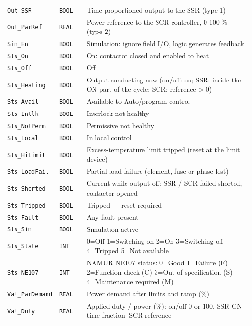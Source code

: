 \begin{small}
\begin{longtable}{@{}P{3.70cm}P{2.20cm}P{1.70cm}P{8.91cm}@{}}
\texttt{Out\_SSR} & \texttt{BOOL} &  & Time-proportioned output to the SSR (type 1) \\
\texttt{Out\_PwrRef} & \texttt{REAL} &  & Power reference to the SCR controller, 0-100 \% (type 2) \\
\texttt{Sim\_En} & \texttt{BOOL} &  & Simulation: ignore field I/\allowbreak{}O, logic generates feedback \\
\texttt{Sts\_On} & \texttt{BOOL} &  & On: contactor closed and enabled to heat \\
\texttt{Sts\_Off} & \texttt{BOOL} &  & Off \\
\texttt{Sts\_Heating} & \texttt{BOOL} &  & Output conducting now (on/\allowbreak{}off: on; SSR: inside the ON part of the cycle; SCR: reference \textgreater{} 0) \\
\texttt{Sts\_Avail} & \texttt{BOOL} &  & Available to Auto/\allowbreak{}program control \\
\texttt{Sts\_Intlk} & \texttt{BOOL} &  & Interlock not healthy \\
\texttt{Sts\_NotPerm} & \texttt{BOOL} &  & Permissive not healthy \\
\texttt{Sts\_Local} & \texttt{BOOL} &  & In local control \\
\texttt{Sts\_HiLimit} & \texttt{BOOL} &  & Excess-temperature limit tripped (reset at the limit device) \\
\texttt{Sts\_LoadFail} & \texttt{BOOL} &  & Partial load failure (element, fuse or phase lost) \\
\texttt{Sts\_Shorted} & \texttt{BOOL} &  & Current while output off: SSR /\allowbreak{} SCR failed shorted, contactor opened \\
\texttt{Sts\_Tripped} & \texttt{BOOL} &  & Tripped --- reset required \\
\texttt{Sts\_Fault} & \texttt{BOOL} &  & Any fault present \\
\texttt{Sts\_Sim} & \texttt{BOOL} &  & Simulation active \\
\texttt{Sts\_State} & \texttt{INT} &  & 0=Off 1=Switching on 2=On 3=Switching off 4=Tripped 5=Not available \\
\texttt{Sts\_NE107} & \texttt{INT} &  & NAMUR NE107 status: 0=Good 1=Failure (F) 2=Function check (C) 3=Out of specification (S) 4=Maintenance required (M) \\
\texttt{Val\_PwrDemand} & \texttt{REAL} &  & Power demand after limits and ramp (\%) \\
\texttt{Val\_Duty} & \texttt{REAL} &  & Applied duty /\allowbreak{} power (\%): on/\allowbreak{}off 0 or 100, SSR ON-time fraction, SCR reference \\

\end{longtable}
\end{small}
